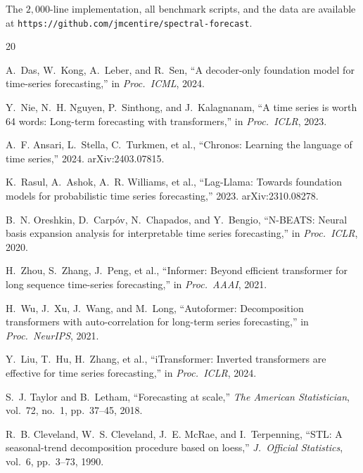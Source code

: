 \documentclass[sigconf,nonacm]{acmart}
\begin{document}
The $2{,}000$-line implementation, all benchmark scripts, and the data are available at \texttt{https://github.com/jmcentire/spectral-forecast}.




\begin{thebibliography}{20}

A.~Das, W.~Kong, A.~Leber, and R.~Sen, ``A decoder-only foundation model for time-series forecasting,'' in \emph{Proc.\ ICML}, 2024.

Y.~Nie, N.~H. Nguyen, P.~Sinthong, and J.~Kalagnanam, ``A time series is worth 64 words: Long-term forecasting with transformers,'' in \emph{Proc.\ ICLR}, 2023.

A.~F. Ansari, L.~Stella, C.~Turkmen, et al., ``Chronos: Learning the language of time series,'' 2024. arXiv:2403.07815.

K.~Rasul, A.~Ashok, A.~R. Williams, et al., ``Lag-Llama: Towards foundation models for probabilistic time series forecasting,'' 2023. arXiv:2310.08278.

B.~N. Oreshkin, D.~Carp\'{o}v, N.~Chapados, and Y.~Bengio, ``N-BEATS: Neural basis expansion analysis for interpretable time series forecasting,'' in \emph{Proc.\ ICLR}, 2020.

H.~Zhou, S.~Zhang, J.~Peng, et al., ``Informer: Beyond efficient transformer for long sequence time-series forecasting,'' in \emph{Proc.\ AAAI}, 2021.

H.~Wu, J.~Xu, J.~Wang, and M.~Long, ``Autoformer: Decomposition transformers with auto-correlation for long-term series forecasting,'' in \emph{Proc.\ NeurIPS}, 2021.

Y.~Liu, T.~Hu, H.~Zhang, et al., ``iTransformer: Inverted transformers are effective for time series forecasting,'' in \emph{Proc.\ ICLR}, 2024.

S.~J. Taylor and B.~Letham, ``Forecasting at scale,'' \emph{The American Statistician}, vol.~72, no.~1, pp.~37--45, 2018.

R.~B. Cleveland, W.~S. Cleveland, J.~E. McRae, and I.~Terpenning, ``STL: A seasonal-trend decomposition procedure based on loess,'' \emph{J.\ Official Statistics}, vol.~6, pp.~3--73, 1990.


\end{thebibliography}
\end{document}
